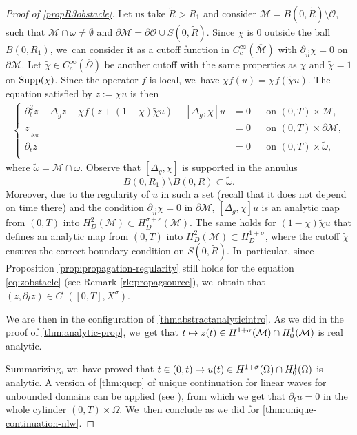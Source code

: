\documentclass[10pt]{amsart}
\newcommand\mto{\mathchoice{\longmapsto}{\mapsto}{\mapsto}{\mapsto}}
\theoremstyle{definition}
\let\mc\mathcal
\let\veps\varepsilon
\newcommand{\M}{\mc{M}}
\renewcommand{\O}{\mc{O}}
\begin{document}
\begin{proof}[Proof of \cref{propR3obstacle}]
Let us take $\widetilde{R}>R_1$ and consider $\M=B(0,\widetilde{R})\setminus \O$, such that $\M\cap\omega\neq \emptyset$ and $\partial \M=\partial \O\cup S(0,\widetilde{R})$. Since $\chi$ is $0$ outside the ball $B(0, R_1)$, we~can consider it as a cutoff function in $C_c^\infty(\overline{\M})$ with $\partial_{\vec n}\chi=0$ on $\partial\M$. Let $\widetilde{\chi}\in C_c^\infty(\overline{\Omega})$ be another cutoff with the same properties as $\chi$ and $\widetilde{\chi}=1$ on $\textnormal{Supp}(\chi)$. Since the operator $f$ is local, we~have $\chi f(u)=\chi f(\widetilde{\chi}u)$. The equation satisfied by $z:=\chi u$ is then
\begin{align}
\label{eq:zobstacle}
\left\{\begin{aligned}
\partial_t^2 z-\Delta_g z+\chi f(z+(1-\chi)\widetilde{\chi}u)-[\Delta_g, \chi]u&=0 &&\text{on }(0, T)\times \M, \\
z_{|_{\partial \M}}&=0 &&\text{on }(0, T)\times \partial\M, \\
\partial_t z&=0 &&\text{on }(0, T)\times \widetilde{\omega},\\
\end{aligned}\right.
\end{align}
where $\widetilde{\omega}=\M\cap\omega$. Observe that $[\Delta_g, \chi]$ is supported in the annulus
\[
B(0, R_1)\setminus B(0, R)\subset \widetilde{\omega}.
\]
Moreover, due to the regularity of $u$ in such a set (recall that it does not depend on time there) and the condition $\partial_{\vec n} \chi=0$ in $\partial\M$, $[\Delta_g, \chi]u$ is an analytic map from $(0, T)$ into $H_D^{2}(\M)\subset H_D^{\sigma+\veps}(\M)$. The same holds for $(1-\chi)\widetilde{\chi}u$ that defines an analytic map from $(0, T)$ into $H_D^{2}(\M)\subset H_D^{1+\sigma}$, where the cutoff $\widetilde{\chi}$ ensures the correct boundary condition on $S(0,\widetilde{R})$. In~particular, since Proposition \eqref{prop:propagation-regularity} still holds for the equation \eqref{eq:zobstacle} (see Remark \ref{rk:propagsource}), we~obtain that $(z, \partial_t z)\in C^0([0, T], X^\sigma)$.

We are then in the configuration of \cref{thmabstractanalyticintro}. As we did in the proof of \cref{thm:analytic-prop}, we~get that $t\mto z(t)\in H^{1+\sigma}(\M)\cap H_0^1(\M)$ is real analytic.

Summarizing, we~have proved that $t\in (0, t)\mto u(t)\in H^{1+\sigma}(\Omega)\cap H_0^1(\Omega)$ is analytic. A version of \cref{thm:qucp} of unique continuation for linear waves for unbounded domains can be applied (see \cite[Cor.\,3.12]{JL13}), from which we get that $\partial_t u=0$ in the whole cylinder $(0, T)\times \Omega$. We~then conclude as we did for \cref{thm:unique-continuation-nlw}.
\end{proof}
\end{document}
